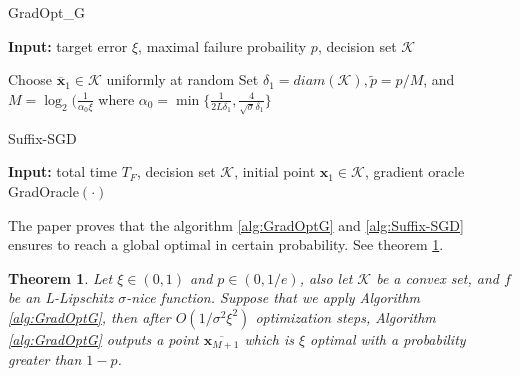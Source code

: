 \begin{algorithm}
\caption{GradOpt_G}
\label{alg:GradOptG}
{\bfseries Input:} target error $\xi$, maximal failure probaility $p$, decision set $\mathcal{K}$
\begin{algorithmic}[1]
\State Choose $\overline{\mathbf{x}}_1 \in \mathcal{K}$ uniformly at random
\State Set $\delta_1 = diam(\mathcal{K}), \tilde{p} = p/M$, and $M = \log_2(\frac{1}{\alpha_0\xi}$ where $\alpha_0=\min\big\{\frac{1}{2L\delta_1}, \frac{4}{\sqrt{\sigma}\delta_1}\big\}$  
\EndFor
\State {}
\end{algorithmic}
\end{algorithm}

\begin{algorithm}
\caption{Suffix-SGD}
\label{alg:Suffix-SGD}
{\bfseries Input:} total time $T_F$, decision set $\mathcal{K}$, initial point $\mathbf{x}_1 \in \mathcal{K}$, gradient oracle GradOracle$(\cdot)$
\begin{algorithmic}[1]
\EndFor
\State {} 
\end{algorithmic}
\end{algorithm}

The paper proves that the algorithm \ref{alg:GradOptG} and \ref{alg:Suffix-SGD} ensures to reach a global optimal in certain probability. See theorem \ref{theorem:GradOptG}.
\newtheorem{theorem:GradOptG}{Theorem}
\begin{theorem:GradOptG}
\label{theorem:GradOptG}
Let $\xi \in (0,1)$ and $p \in (0, 1/e)$, also let $\mathcal{K}$ be a convex set, and $f$ be an L-Lipschitz $\sigma$-nice function. Suppose that we apply Algorithm \ref{alg:GradOptG}, then after $O(1/\sigma^2\xi^2)$ optimization steps, Algorithm \ref{alg:GradOptG} outputs a point $\overline{\mathbf{x}_{M+1}}$ which is $\xi$ optimal with a probability greater than $1-p$.
\end{theorem:GradOptG}
